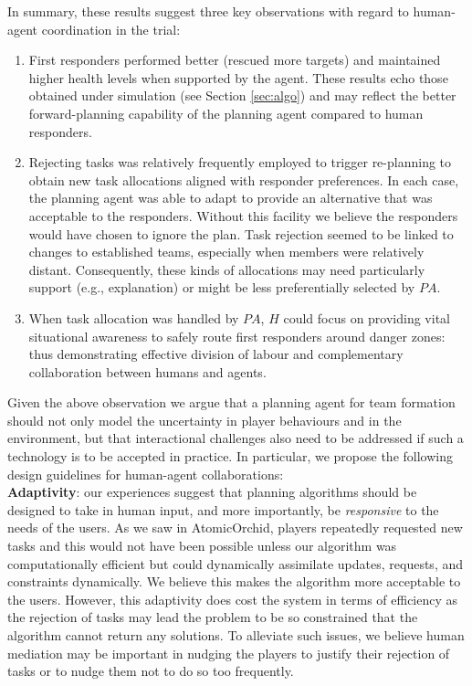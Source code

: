 In summary, these results suggest three key observations with regard to  human-agent coordination in the trial: 
\begin{enumerate}
\item First responders performed better (rescued more targets)  and maintained higher health levels when supported by the agent.  These results echo those obtained under simulation (see Section \ref{sec:algo}) and  may reflect the better forward-planning capability of the planning agent compared to human responders. 
 
\item Rejecting tasks was relatively frequently employed to trigger re-planning to obtain new task allocations aligned with responder preferences.  In each case, the planning agent was able to adapt to provide an alternative  that was acceptable to the responders. Without this facility we believe the responders would have chosen to ignore the plan. Task rejection seemed to be linked to changes to established teams, especially when members were relatively distant. Consequently, these kinds of allocations may need particularly support (e.g., explanation) or might be less preferentially selected by $PA$.

\item When task allocation was handled by $PA$, $H$ could focus on providing vital situational awareness to safely route first responders around danger zones: thus demonstrating effective division of labour and complementary collaboration between humans and agents.
\end{enumerate}

Given the above observation we argue that a planning agent for team formation should not only model the uncertainty in player behaviours and in the environment, but that interactional challenges also need to be addressed  if such a technology is to be accepted in practice. In particular, we propose the following design guidelines for human-agent collaborations:\\

\noindent \textbf{Adaptivity}: our experiences suggest that planning algorithms should be designed to take in human input, and more importantly, be \emph{responsive} to the needs of the users. As we saw in AtomicOrchid, players repeatedly requested new tasks and this would not have been possible unless our algorithm  was computationally efficient but could dynamically assimilate updates, requests, and constraints dynamically. We believe this makes the algorithm more acceptable to the users. However, this adaptivity does cost the system in terms of efficiency as the rejection of tasks may lead the problem to be so constrained that the algorithm cannot return any solutions. To alleviate such issues, we believe human mediation may be important in nudging the players to justify their rejection of tasks or to nudge them not to do so too frequently. \\

